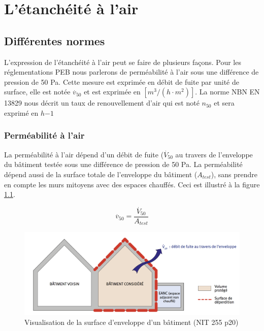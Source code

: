 
\chapter{L'étanchéité à l'air}

\ifpdf
    \graphicspath{{Chapter2/Figs/Raster/}{Chapter2/Figs/PDF/}{Chapter2/Figs/}}
\else
    \graphicspath{{Chapter2/Figs/Vector/}{Chapter2/Figs/}}
\fi


\section{Différentes normes}

L'expression de l'étanchéité à l'air peut se faire de plusieurs façons. Pour les réglementations PEB nous parlerons de perméabilité à l'air sous une différence de pression de 50 Pa. Cette mesure est exprimée en débit de fuite par unité de surface, elle est notée $\stackrel{.}{v}_{50}$ et est exprimée en $[m^3/(h\cdot m^2)]$.
La norme NBN EN 13829 nous décrit un taux de renouvellement d'air qui est noté $n_{50}$ et sera exprimé en $h{-1}$

\subsection{Perméabilité à l'air}
La perméabilité à l'air dépend d'un débit de fuite ($\stackrel{.}{V}_{50}$ au travers de l'enveloppe du bâtiment testée sous une différence de pression de 50 Pa. La perméabilité dépend aussi de la surface totale de l'enveloppe du bâtiment ($A_{test}$), sans prendre en compte les murs mitoyens avec des espaces chauffés. Ceci est illustré à la figure \ref{SurfaceEnveloppe}.

$$\stackrel{.}{v}_{50}= \dfrac{\stackrel{.}{V}_{50}}{A_{test}}$$

\begin{figure}[h]
\centering
\includegraphics[width=1.0\textwidth]{SurfaceEnveloppe}
\caption{\label{SurfaceEnveloppe} Visualisation de la surface d'enveloppe d'un bâtiment (NIT 255 p20)}
\end{figure}

